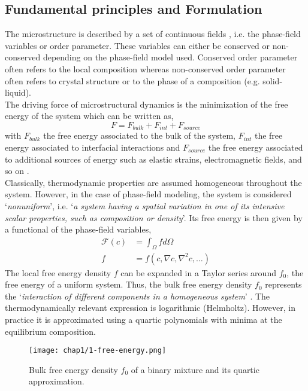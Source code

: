 \subsection{Fundamental principles and Formulation}
    The microstructure is described by a set of continuous fields \cite{}, i.e. the phase-field variables or order parameter. These variables can either be conserved or non-conserved depending on the phase-field model used. Conserved order parameter often refers to the local composition whereas non-conserved order parameter often refers to crystal structure or to the phase of a composition (e.g. solid-liquid).\\
    The driving force of microstructural dynamics is the minimization of the free energy of the system \cite{} which can be written as,
    \begin{equation}
        F = F_{bulk} + F_{int} + F_{source}
    \end{equation}
    with $F_{bulk}$ the free energy associated to the bulk of the system, $F_{int}$ the free energy associated to interfacial interactions and $F_{source}$ the free energy associated to additional sources of energy such as elastic strains, electromagnetic fields, and so on \cite{}.\\
    Classically, thermodynamic properties are assumed homogeneous throughout the system. However, in the case of phase-field modeling, the system is considered `\textit{nonuniform}', i.e. `\textit{a system having a spatial variation in one of its intensive scalar properties, such as composition or density}'\cite{CahnHilliard1958}. Its free energy is then given by a functional of the phase-field variables,
    \begin{equation}
        \begin{aligned}
            \mathcal{F}(c) &= \int_{\Omega} f d\Omega\\
            f &= f(c, \nabla c, \nabla^2 c, \ldots)
        \end{aligned}
    \end{equation}
    The local free energy density $f$ can be expanded in a Taylor series around $f_0$, the free energy of a uniform system. Thus, the bulk free energy density $f_0$ represents the `\textit{interaction of different components in a homogeneous system}' \cite{Wu2022}. The thermodynamically relevant expression is logarithmic (Helmholtz). However, in practice it is approximated using a quartic polynomials with minima at the equilibrium composition.
    \begin{figure}
        \centering
        \texttt{[image: chap1/1-free-energy.png]}
        \caption{Bulk free energy density $f_0$ of a binary mixture and its quartic approximation. \cite{LeeHuhJeongShinYunKim2014}}
        \label{fig:1-free-energy}
    \end{figure}
